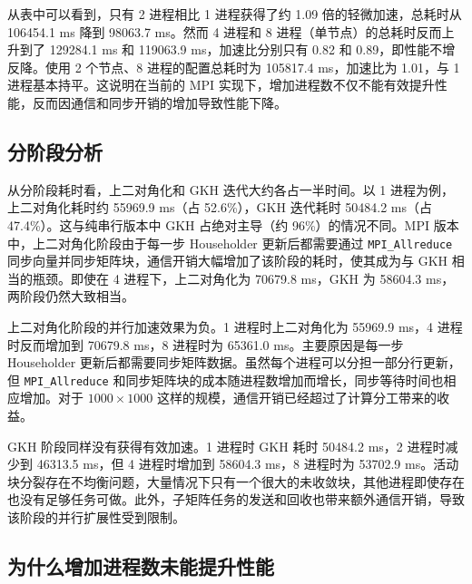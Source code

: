 \documentclass[UTF8,a4paper,12pt]{ctexart}
\begin{document}
从表中可以看到，只有 2 进程相比 1 进程获得了约 1.09 倍的轻微加速，总耗时从 106454.1 ms 降到 98063.7 ms。然而 4 进程和 8 进程（单节点）的总耗时反而上升到了 129284.1 ms 和 119063.9 ms，加速比分别只有 0.82 和 0.89，即性能不增反降。使用 2 个节点、8 进程的配置总耗时为 105817.4 ms，加速比为 1.01，与 1 进程基本持平。这说明在当前的 MPI 实现下，增加进程数不仅不能有效提升性能，反而因通信和同步开销的增加导致性能下降。

\subsection{分阶段分析}

从分阶段耗时看，上二对角化和 GKH 迭代大约各占一半时间。以 1 进程为例，上二对角化耗时约 55969.9 ms（占 52.6\%），GKH 迭代耗时 50484.2 ms（占 47.4\%）。这与纯串行版本中 GKH 占绝对主导（约 96\%）的情况不同。MPI 版本中，上二对角化阶段由于每一步 Householder 更新后都需要通过 \texttt{MPI\_Allreduce} 同步向量并同步矩阵块，通信开销大幅增加了该阶段的耗时，使其成为与 GKH 相当的瓶颈。即使在 4 进程下，上二对角化为 70679.8 ms，GKH 为 58604.3 ms，两阶段仍然大致相当。

上二对角化阶段的并行加速效果为负。1 进程时上二对角化为 55969.9 ms，4 进程时反而增加到 70679.8 ms，8 进程时为 65361.0 ms。主要原因是每一步 Householder 更新后都需要同步矩阵数据。虽然每个进程可以分担一部分行更新，但 \texttt{MPI\_Allreduce} 和同步矩阵块的成本随进程数增加而增长，同步等待时间也相应增加。对于 $1000\times1000$ 这样的规模，通信开销已经超过了计算分工带来的收益。

GKH 阶段同样没有获得有效加速。1 进程时 GKH 耗时 50484.2 ms，2 进程时减少到 46313.5 ms，但 4 进程时增加到 58604.3 ms，8 进程时为 53702.9 ms。活动块分裂存在不均衡问题，大量情况下只有一个很大的未收敛块，其他进程即使存在也没有足够任务可做。此外，子矩阵任务的发送和回收也带来额外通信开销，导致该阶段的并行扩展性受到限制。

\subsection{为什么增加进程数未能提升性能}
\end{document}
